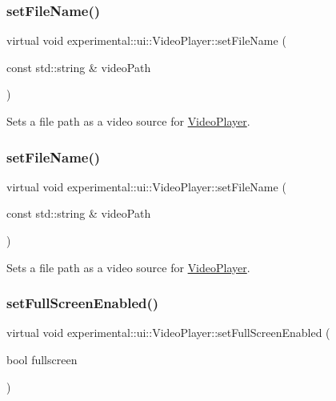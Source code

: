 \subsubsection{\texorpdfstring{set\+File\+Name()}{setFileName()}\hspace{0.1cm}{\footnotesize\ttfamily [1/2]}}
{\footnotesize\ttfamily virtual void experimental\+::ui\+::\+Video\+Player\+::set\+File\+Name (\begin{DoxyParamCaption}\item[{const std\+::string \&}]{video\+Path }\end{DoxyParamCaption})\hspace{0.3cm}{\ttfamily [virtual]}}

Sets a file path as a video source for \hyperlink{classexperimental_1_1ui_1_1VideoPlayer}{Video\+Player}. \mbox{\label{classexperimental_1_1ui_1_1VideoPlayer_a329b486cfda4e7ec8e22945f4f22ea62}} 
\subsubsection{\texorpdfstring{set\+File\+Name()}{setFileName()}\hspace{0.1cm}{\footnotesize\ttfamily [2/2]}}
{\footnotesize\ttfamily virtual void experimental\+::ui\+::\+Video\+Player\+::set\+File\+Name (\begin{DoxyParamCaption}\item[{const std\+::string \&}]{video\+Path }\end{DoxyParamCaption})\hspace{0.3cm}{\ttfamily [virtual]}}

Sets a file path as a video source for \hyperlink{classexperimental_1_1ui_1_1VideoPlayer}{Video\+Player}. \mbox{\label{classexperimental_1_1ui_1_1VideoPlayer_ab22336427d46be866e023e5b57f5fe68}} 
\subsubsection{\texorpdfstring{set\+Full\+Screen\+Enabled()}{setFullScreenEnabled()}\hspace{0.1cm}{\footnotesize\ttfamily [1/2]}}
{\footnotesize\ttfamily virtual void experimental\+::ui\+::\+Video\+Player\+::set\+Full\+Screen\+Enabled (\begin{DoxyParamCaption}\item[{bool}]{fullscreen }\end{DoxyParamCaption})\hspace{0.3cm}{\ttfamily [virtual]}}

